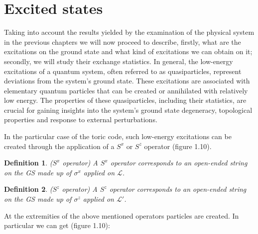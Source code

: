 \documentclass{Configuration_Files/PoliMi3i_thesis}
\newtheorem{definition}{Definition}[chapter]
\begin{document}





















\newpage
\section{Excited states}
\label{sec:ES}


Taking into account the results yielded by the examination of the physical system in the previous chapters we will now proceed to describe, firstly, what are the excitations on the ground state and what kind of excitations we can obtain on it; secondly, we will study their exchange statistics. In general, the low-energy excitations of a quantum system, often referred to as quasiparticles, represent deviations from the system's ground state. These excitations are associated with elementary quantum particles that can be created or annihilated with relatively low energy. The properties of these quasiparticles, including their statistics, are crucial for gaining insights into the system's ground state degeneracy, topological properties and response to external perturbations. \newline

In the particular case of the toric code, such low-energy excitations can be created through the application of a $S^x$ or $S^z$ operator (figure 1.10).

\begin{definition}($S^x$ operator)
	A $S^x$ operator corresponds to an open-ended string on the GS made up of $\sigma^x$ applied on $\mathcal{L}$.
\end{definition}

\begin{definition}($S^z$ operator)
	A $S^z$ operator corresponds to an open-ended string on the GS made up of $\sigma^z$ applied on $\mathcal{L'}$.
\end{definition}

At the extremities of the above mentioned operators particles are created. In particular we can get (figure 1.10):
\end{document}
